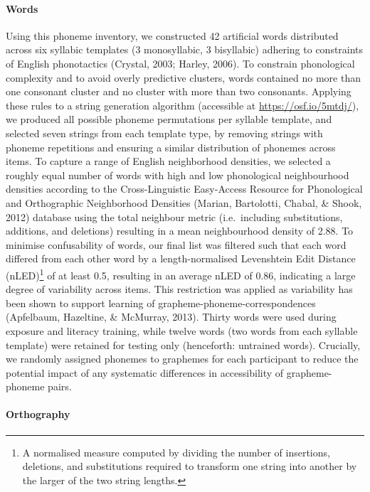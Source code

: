 \documentclass[doc,floatsintext]{apa6}
\let\oldparagraph\paragraph
\renewcommand{\paragraph}[1]{\oldparagraph{#1}\mbox{}}
\let\rmarkdownfootnote\footnote%
\def\footnote{\protect\rmarkdownfootnote}
\begin{document}
\paragraph{Words}\label{words}

Using this phoneme inventory, we constructed 42 artificial words
distributed across six syllabic templates (3 monosyllabic, 3 bisyllabic)
adhering to constraints of English phonotactics (Crystal, 2003; Harley,
2006). To constrain phonological complexity and to avoid overly
predictive clusters, words contained no more than one consonant cluster
and no cluster with more than two consonants. Applying these rules to a
string generation algorithm (accessible at \url{https://osf.io/5mtdj/}),
we produced all possible phoneme permutations per syllable template, and
selected seven strings from each template type, by removing strings with
phoneme repetitions and ensuring a similar distribution of phonemes
across items. To capture a range of English neighborhood densities, we
selected a roughly equal number of words with high and low phonological
neighbourhood densities according to the Cross-Linguistic Easy-Access
Resource for Phonological and Orthographic Neighborhood Densities
(Marian, Bartolotti, Chabal, \& Shook, 2012) database using the total
neighbour metric (i.e.~including substitutions, additions, and
deletions) resulting in a mean neighbourhood density of 2.88. To
minimise confusability of words, our final list was filtered such that
each word differed from each other word by a length-normalised
Levenshtein Edit Distance (nLED)\footnote{A normalised measure computed
  by dividing the number of insertions, deletions, and substitutions
  required to transform one string into another by the larger of the two
  string lengths.} of at least 0.5, resulting in an average nLED of
0.86, indicating a large degree of variability across items. This
restriction was applied as variability has been shown to support
learning of grapheme-phoneme-correspondences (Apfelbaum, Hazeltine, \&
McMurray, 2013). Thirty words were used during exposure and literacy
training, while twelve words (two words from each syllable template)
were retained for testing only (henceforth: untrained words). Crucially,
we randomly assigned phonemes to graphemes for each participant to
reduce the potential impact of any systematic differences in
accessibility of grapheme-phoneme pairs.

\paragraph{Orthography}\label{orthography}
\end{document}
